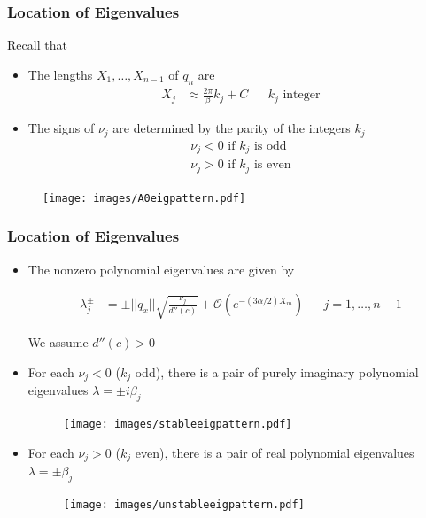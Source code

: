 \documentclass[16pt]{beamer}
\begin{document}
\begin{frame}
\frametitle{Location of Eigenvalues}
	Recall that
	\begin{itemize}

		\item The lengths $X_1, \dots, X_{n-1}$ of $q_n$ are
		\begin{align*}
		X_j &\approx \frac{2\pi}{\beta} k_j + C && k_j \text{ integer}
	    \end{align*}

    	\item The signs of $\nu_j$ are determined by the parity of the integers $k_j$ 
        \begin{align*}
            \nu_j < 0 \text{ if } k_j \text{ is odd} \\
            \nu_j > 0 \text{ if } k_j \text{ is even} 
        \end{align*}
	\end{itemize}
	    \begin{figure}
		\begin{center}
		\texttt{[image: images/A0eigpattern.pdf]}
		\end{center}
		\end{figure}
\end{frame}

\begin{frame}
\frametitle{Location of Eigenvalues}
	\begin{itemize}
		\item The nonzero polynomial eigenvalues are given by

		\begin{align*}
      		\lambda_j^\pm &= \pm ||q_x|| \sqrt{ \frac{\nu_j}{d''(c)} } + \mathcal{O}(e^{-(3 \alpha/2) X_m})
      		&&j = 1, \dots, n-1
      	\end{align*}

      	We assume $d''(c) > 0$

        \item For each $\nu_j < 0$ ($k_j$ odd), there is a pair of purely imaginary polynomial eigenvalues $\lambda = \pm i \beta_j$
       	\begin{figure}
		\begin{center}
		\texttt{[image: images/stableeigpattern.pdf]}
		\end{center}
		\end{figure}

        \item For each $\nu_j > 0$ ($k_j$ even), there is a pair of real polynomial eigenvalues $\lambda = \pm \beta_j$

        \begin{figure}
		\begin{center}
		\texttt{[image: images/unstableeigpattern.pdf]}
		\end{center}
		\end{figure}
	\end{itemize}
\end{frame}
\end{document}
